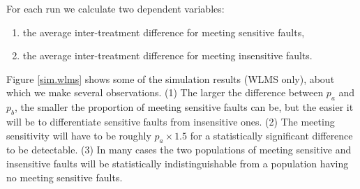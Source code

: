 For each run we calculate two dependent variables:

\begin{enumerate}

\item the average inter-treatment difference for meeting sensitive faults, 
\item the average inter-treatment difference for meeting insensitive faults.

\end{enumerate}


Figure \ref{sim.wlms} 
shows some of the simulation results (WLMS only), 
about which we make several observations. 
(1) The larger the difference between $p_a$ and $p_b$,
the smaller the proportion of meeting sensitive faults can be,
but the easier it will be to differentiate sensitive faults from 
insensitive ones. 
(2) The meeting sensitivity will have to be roughly 
$p_a \times 1.5$ for a statistically significant difference
to be detectable.
(3) In many cases the two populations of meeting sensitive and insensitive 
faults will be statistically
indistinguishable from a population having no meeting sensitive faults. 

